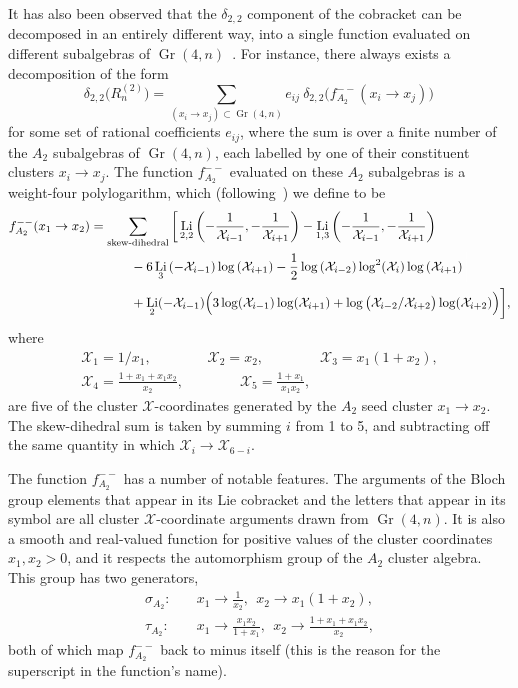 \documentclass[11pt]{article}
\DeclareMathOperator{\Gr}{Gr}
\DeclareMathOperator{\Li}{Li}
\def\x{\mathcal{X}}
\begin{document}
It has also been observed that the $\delta_{2,2}$ component of the cobracket can be decomposed in an entirely different way, into a single function evaluated on different subalgebras of $\Gr(4,n)$~\cite{Golden:2014xqa}. For instance, there always exists a decomposition of the form
\begin{equation} \label{eq:a2_decomp}
	\delta_{2,2} \big(R_n^{(2)}\big) = \!\! \sum_{(x_i\to x_j) \subset \Gr(4,n)} \!\!\! e_{ij} ~\delta_{2,2}\big(f^{--}_{A_2}(x_i \to x_j) \big) \, 
\end{equation}
for some set of rational coefficients $e_{ij}$, where the sum is over a finite number of the $A_2$ subalgebras of $\Gr(4,n)$, each labelled by one of their constituent clusters $x_i \to x_j$. The function $f^{--}_{A_2}$ evaluated on these $A_2$ subalgebras is a weight-four polylogarithm, which (following~\cite{Golden:2018gtk}) we define to be
\begin{align}\label{def:a2-function}
        f^{--}_{A_2}(x_1 \to x_2)  &= \sum_{\text{skew-dihedral}} \bigg[ \Li_{2,2}\left(-\frac{1}{\x_{i-1}},-\frac{1}{\x_{i+1}}\right) - \Li_{1,3}\left(-\frac{1}{\x_{i-1}},-\frac{1}{\x_{i+1}}\right)  \\
        &\hspace{1.1cm} -6 \Li_3\left(-\x_{i-1}\right) \log \left(\x_{i+1}\right) -\frac{1}{2} \log \left(\x_{i-2}\right) \log^2\! \left(\x_i\right) \log \left(\x_{i+1}\right)  {\color{white} \bigg|} \nonumber \\
        &\hspace{1.1cm} +\Li_2(-\x_{i-1}) \Big(3 \log (\x_{i-1})\log (\x_{i+1})+\log \big(\x_{i-2}/\x_{i+2}\big)\log (\x_{i+2})\Big) \bigg], \nonumber
\end{align}
where 
\begin{gather}\label{def:a2-xcoords}
  \x_1 = 1/x_1, \qquad \qquad \x_2 = x_2, \qquad \qquad \x_3 = x_1(1+x_2), \\ 
  \x_4 = \frac{1+x_1+x_1 x_2}{x_2}, \qquad \qquad \x_5 = \frac{1+x_1}{x_1 x_2}, \nonumber
\end{gather}
are five of the cluster $\x$-coordinates generated by the $A_2$ seed cluster $x_1 \to x_2$. The skew-dihedral sum is taken by summing $i$ from 1 to 5, and subtracting off the same quantity in which $\x_i \to \x_{6-i}$.

The function $f^{--}_{A_2}$ has a number of notable features. The arguments of the Bloch group elements that appear in its Lie cobracket and the letters that appear in its symbol are all cluster $\x$-coordinate arguments drawn from $\Gr(4,n)$. It is also a smooth and real-valued function for positive values of the cluster coordinates $x_1, x_2>0$, and it respects the automorphism group of the $A_2$ cluster algebra. This group has two generators,
\begin{align} 
  \sigma_{A_2}:&\quad x_1\to \frac{1}{x_2},~~ x_2\to x_1(1+x_2), \label{eq:a2_automorphism_generator_1} \\
  \tau_{A_2}:&\quad  x_1 \to \frac{x_1 x_2}{1 + x_1}, ~~x_2 \to \frac{1 + x_1 + x_1 x_2}{x_2}, \label{eq:a2_automorphism_generator_2}
\end{align}
both of which map $f_{A_2}^{--}$ back to minus itself (this is the reason for the superscript in the function's name). 
\end{document}

